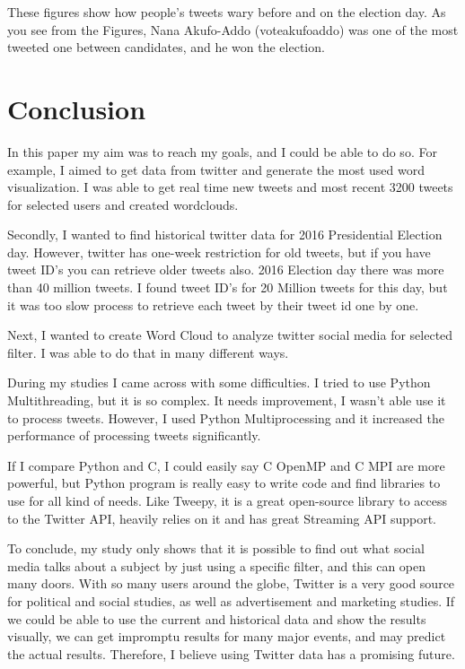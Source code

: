 \documentclass[12pt,notitlepage]{article}
\begin{document}
These figures show how people's tweets wary before and on the election day. As you see from the Figures, Nana Akufo-Addo (voteakufoaddo) was one of the most tweeted one between candidates, and he won the election.


















\section{Conclusion} 

In this paper my aim was to reach my goals, and I could be able to do so. For example, I aimed to get data from twitter and generate the most used word visualization. I was able to get real time new tweets and most recent 3200 tweets for selected users and created wordclouds. 

Secondly, I wanted to find historical twitter data for 2016 Presidential Election day. However, twitter has one-week restriction for old tweets, but if you have tweet ID's you can retrieve older tweets also. 2016 Election day there was more than 40 million tweets. I found tweet ID's for 20 Million tweets for this day, but it was too slow process to retrieve each tweet by their tweet id one by one. 

Next, I wanted to create Word Cloud to analyze twitter social media for selected filter. I was able to do that in many different ways.

During my studies I came across with some difficulties. I tried to use Python Multithreading, but it is so complex. It needs improvement, I wasn't able use it to process tweets. However, I used Python Multiprocessing and it increased the performance of processing tweets significantly. 

If I compare Python and C, I could easily say C OpenMP and C MPI are more powerful, but Python program is really easy to write code and find libraries to use for all kind of needs.
Like Tweepy, it is a great open-source library to access to the Twitter API, heavily relies on it and has great Streaming API support. 

To conclude, my study only shows that it is possible to find out what social media talks about a subject by just using a specific filter, and this can open many doors. With so many users around the globe, Twitter is a very good source for political and social studies, as well as advertisement and marketing studies. If we could be able to use the current and historical data and show the results visually, we can get impromptu results for many major events, and may predict the actual results. Therefore, I believe using Twitter data has a promising future.









\end{document}
